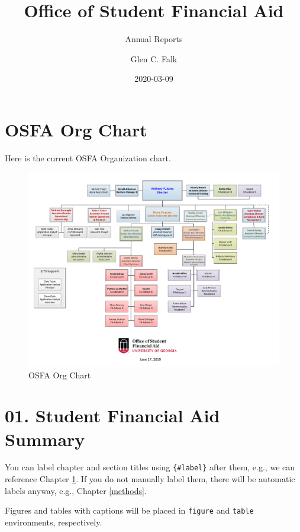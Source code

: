 \documentclass[
]{book}
\title{Office of Student Financial Aid}
\subtitle{Annual Reports}
\author{Glen C. Falk}
\date{2020-03-09}
\begin{document}
\maketitle

{
\setcounter{tocdepth}{1}
\tableofcontents
}
\hypertarget{osfa-org-chart}{%
\chapter*{OSFA Org Chart}\label{osfa-org-chart}}

Here is the current OSFA Organization chart.

\begin{figure}

{\centering \includegraphics[width=1\linewidth]{images/OSFAOrgChart} 

}

\caption{OSFA Org Chart}\label{fig:label}
\end{figure}

\hypertarget{intro}{%
\chapter{01. Student Financial Aid Summary}\label{intro}}

You can label chapter and section titles using \texttt{\{\#label\}} after them, e.g., we can reference Chapter \ref{intro}. If you do not manually label them, there will be automatic labels anyway, e.g., Chapter \ref{methods}.

Figures and tables with captions will be placed in \texttt{figure} and \texttt{table} environments, respectively.
\end{document}
